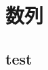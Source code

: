 \documentclass[../main.tex]{subfiles} %
\begin{document}
\clearpage
\chapter{数列}
    \section{test}
\end{document}
